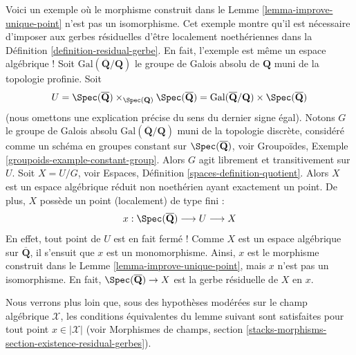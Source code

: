 \begin{example}
\label{example-distinct}
Voici un exemple où le morphisme construit dans le
Lemme \ref{lemma-improve-unique-point}
n'est pas un isomorphisme. Cet exemple montre qu'il est nécessaire d'imposer
aux gerbes résiduelles d'être localement noethériennes dans la
Définition \ref{definition-residual-gerbe}.
En fait, l'exemple est même un espace algébrique !
Soit $\text{Gal}(\overline{\mathbf{Q}}/\mathbf{Q})$ le groupe de
Galois absolu de $\mathbf{Q}$ muni de la topologie profinie.
Soit
$$
U =
\Spec(\overline{\mathbf{Q}})
\times_{\Spec(\mathbf{Q})}
\Spec(\overline{\mathbf{Q}}) =
\text{Gal}(\overline{\mathbf{Q}}/\mathbf{Q}) \times
\Spec(\overline{\mathbf{Q}})
$$
(nous omettons une explication précise du sens du dernier signe égal).
Notons $G$ le groupe de Galois absolu
$\text{Gal}(\overline{\mathbf{Q}}/\mathbf{Q})$ muni de la topologie
discrète, considéré comme un schéma en groupes constant sur
$\Spec(\overline{\mathbf{Q}})$, voir
Groupoïdes, Exemple \ref{groupoids-example-constant-group}.
Alors $G$ agit librement et transitivement sur $U$.
Soit $X = U/G$, voir
Espaces, Définition \ref{spaces-definition-quotient}.
Alors $X$ est un espace algébrique réduit non noethérien ayant exactement un point.
De plus, $X$ possède un point (localement) de type fini :
$$
x :
\Spec(\overline{\mathbf{Q}}) \longrightarrow
U \longrightarrow X
$$
En effet, tout point de $U$ est en fait fermé !
Comme $X$ est un espace algébrique sur $\overline{\mathbf{Q}}$,
il s'ensuit que $x$ est un monomorphisme. Ainsi, $x$ est le morphisme
construit dans le
Lemme \ref{lemma-improve-unique-point},
mais $x$ n'est pas un isomorphisme. En fait,
$\Spec(\overline{\mathbf{Q}}) \to X$ est la gerbe résiduelle de $X$ en $x$.
\end{example}

\noindent
Nous verrons plus loin que, sous des hypothèses modérées sur le champ algébrique
$\mathcal{X}$, les conditions équivalentes du lemme suivant sont satisfaites
pour tout point $x \in |\mathcal{X}|$ (voir Morphismes de champs, section
\ref{stacks-morphisms-section-existence-residual-gerbes}).

